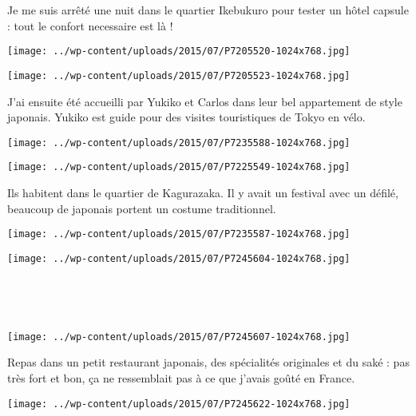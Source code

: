  Je me suis arrêté une nuit dans le quartier Ikebukuro pour tester un hôtel capsule : tout le confort necessaire est là ! 
\begin{center} \texttt{[image: ../wp-content/uploads/2015/07/P7205520-1024x768.jpg]} \end{center}
\begin{center} \texttt{[image: ../wp-content/uploads/2015/07/P7205523-1024x768.jpg]} \end{center}
\vspace{-\topsep}
\vspace{-2.75mm}
\pagebreak

 J'ai ensuite été accueilli par Yukiko et Carlos dans leur bel appartement de style japonais. Yukiko est guide pour des visites touristiques de Tokyo en vélo. 
\begin{center} \texttt{[image: ../wp-content/uploads/2015/07/P7235588-1024x768.jpg]} \end{center}
\begin{center} \texttt{[image: ../wp-content/uploads/2015/07/P7225549-1024x768.jpg]} \end{center}
\vspace{-\topsep}
\vspace{-2.25mm}
\pagebreak

 Ils habitent dans le quartier de Kagurazaka. Il y avait un festival avec un défilé, beaucoup de japonais portent un costume traditionnel. \\
\begin{center} \texttt{[image: ../wp-content/uploads/2015/07/P7235587-1024x768.jpg]} \end{center}
\begin{center} \texttt{[image: ../wp-content/uploads/2015/07/P7245604-1024x768.jpg]} \end{center}
\vspace{-\topsep}
\vspace{-2.25mm}
\pagebreak
~

~
\vspace{1mm}
\begin{center} \texttt{[image: ../wp-content/uploads/2015/07/P7245607-1024x768.jpg]} \end{center}

 Repas dans un petit restaurant japonais, des spécialités originales et du saké : pas très fort et bon, ça ne ressemblait pas à ce que j'avais goûté en France. 
\begin{center} \texttt{[image: ../wp-content/uploads/2015/07/P7245622-1024x768.jpg]} \end{center}
\vspace{-\topsep}
\pagebreak

